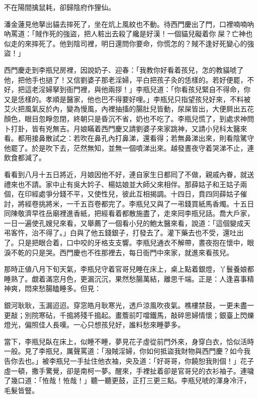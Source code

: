 \begin{myquote} 
不在陽間擒鼠耗，卻歸陰府作狸仙。
\end{myquote} 

潘金蓮見他拏出貓去摔死了，坐在炕上風紋也不動。待西門慶出了門，口裡喃喃吶吶罵道：「賊作死的強盜，把人粧出去殺了纔是好漢！一個貓兒礙着你𠳹屎？亡神也似走的來摔死了。他到陰司裡，明日還問你要命，你慌怎的？賊不逢好死變心的強盜！」{}

西門慶走到李瓶兒房裡，因說奶子、迎春：「我教你好看着孩兒，怎的教貓唬了他，把他手也撾了！又信劉婆子那老淫婦，平白把孩子灸的恁樣的。若好便罷，不好，把這老淫婦拏到衙門裡，與他兩拶！」李瓶兒道：「你看孩兒緊自不得命，你又是恁樣的。孝順是醫家，他也巴不得要好哩。」李瓶兒只指望孩兒好來，不料被艾火把風氣反於內，變為慢風，內裡抽搐的腸肚兒皆動，尿屎皆出，大便屙出五花顏色，眼目忽睜忽閉，終朝只是昏沉不省，奶也不吃了。李瓶兒慌了，到處求神問卜打卦，皆有兇無吉。月娘瞞着西門慶又請劉婆子來家跳神，又請小兒科太醫來看。都用接鼻散試之：若吹在鼻孔內打鼻涕，還看得；若無鼻涕出來，則看陰騭守他罷了。於是吹下去，茫然無知，並無一個噴涕出來。越發晝夜守着哭涕不止，連飲食都減了。

看看到八月十五日將近，月娘因他不好，連自家生日都囘了不做，親戚內眷，就送禮來也不請。家中止有吳大妗子、楊姑娘並大師父來相伴。那薛姑子和王姑子兩個，在印經處爭分錢不平，又使性兒，彼此互相揭調。十四日，賁四同薛姑子催討，將經卷挑將米，一千五百卷都完了。李瓶兒又與了一弔錢買紙馬香燭。十五日同陳敬濟早徃岳廟裡進香紙，把經看着都散施盡了，走來囘李瓶兒話。喬大戶家，一日一遍使孔嫂兒來看，又舉薦了一個看小兒的鮑太醫來看，說道：「這個變成天弔客忤，治不得了。」白與了他五錢銀子，打發去了。灌下藥去也不受，還吐出了。只是把眼合着，口中咬的牙格支支響。李瓶兒通衣不解帶，晝夜抱在懷中，眼淚不乾的只是哭。西門慶也不徃那裡去，每日衙門中來家，就進來看孩兒。

那時正値八月下旬天氣，李瓶兒守着官哥兒睡在床上，桌上點着銀燈，丫鬟養娘都睡熟了。覷着滿窓月色，更漏沉沉，果然愁腸萬結，離思千端。正是：人逢喜事精神爽，悶來愁腸瞌睡多。但見：

\begin{myquote} 
銀河耿耿，玉漏迢迢。穿窓皓月耿寒光，透戶涼風吹夜氣。樵樓禁鼓，一更未盡一更敲；別院寒砧，千搗將殘千搗起。畫簷前叮噹鐵馬，敲碎思婦情懷；銀臺上閃爍燈光，偏照佳人長嘆。一心只想孩兒好，誰料愁來睡夢多。
\end{myquote} 

當下，李瓶兒臥在床上，似睡不睡，夢見花子虛從前門外來，身穿白衣，恰似活時一般。見了李瓶兒，厲聲罵道：「潑賊淫婦，你如何抵盜我財物與西門慶？如今我告你去也。」被李瓶兒一手扯住他衣袖，央及道：「好哥哥，你饒恕我則個！」花子虛一頓，撒手驚覺，卻是南柯一夢。{}醒來，手裡扯着卻是官哥兒的衣衫袖子。連噦了幾口道：「恠哉！恠哉！」聽一聽更鼓，正打三更三點。李瓶兒唬的渾身冷汗，毛髮皆豎。

